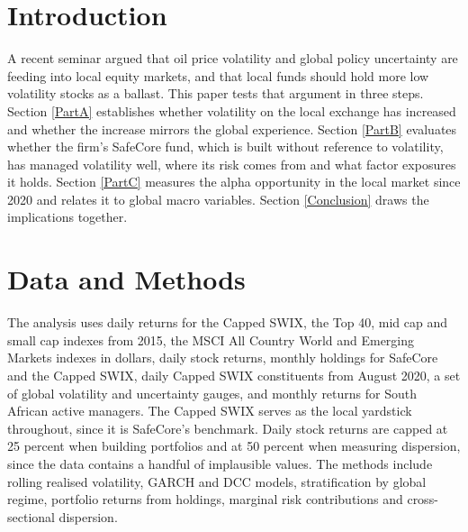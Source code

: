 \documentclass[11pt,preprint]{elsarticle}
\numberwithin{equation}{section}
\numberwithin{figure}{section}
\numberwithin{table}{section}
\begin{document}
\setcounter{footnote}{0}



\pagestyle{fancy}
\chead{}
\rhead{}
\lfoot{}
\lhead{}
\cfoot{}


\headsep 35pt %




\section{\texorpdfstring{Introduction
\label{Intro}}{Introduction }}\label{introduction}

A recent seminar argued that oil price volatility and global policy
uncertainty are feeding into local equity markets, and that local funds
should hold more low volatility stocks as a ballast. This paper tests
that argument in three steps. Section \ref{PartA} establishes whether
volatility on the local exchange has increased and whether the increase
mirrors the global experience. Section \ref{PartB} evaluates whether the
firm's SafeCore fund, which is built without reference to volatility,
has managed volatility well, where its risk comes from and what factor
exposures it holds. Section \ref{PartC} measures the alpha opportunity
in the local market since 2020 and relates it to global macro variables.
Section \ref{Conclusion} draws the implications together.

\section{\texorpdfstring{Data and Methods
\label{Data}}{Data and Methods }}\label{data-and-methods}

The analysis uses daily returns for the Capped SWIX, the Top 40, mid cap
and small cap indexes from 2015, the MSCI All Country World and Emerging
Markets indexes in dollars, daily stock returns, monthly holdings for
SafeCore and the Capped SWIX, daily Capped SWIX constituents from August
2020, a set of global volatility and uncertainty gauges, and monthly
returns for South African active managers. The Capped SWIX serves as the
local yardstick throughout, since it is SafeCore's benchmark. Daily
stock returns are capped at 25 percent when building portfolios and at
50 percent when measuring dispersion, since the data contains a handful
of implausible values. The methods include rolling realised volatility,
GARCH and DCC models, stratification by global regime, portfolio returns
from holdings, marginal risk contributions and cross-sectional
dispersion.
\end{document}
